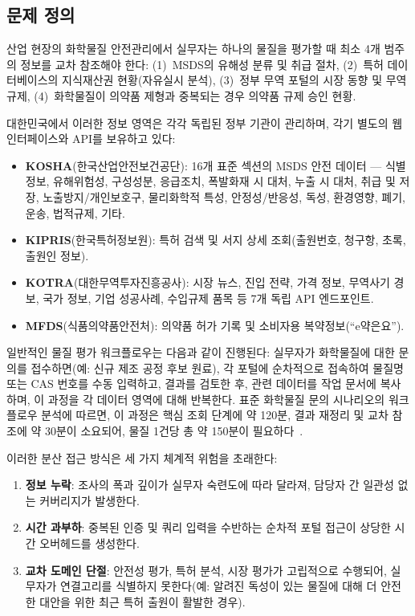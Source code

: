 \documentclass[preprint,12pt]{elsarticle}
\begin{document}
\subsection{문제 정의}

산업 현장의 화학물질 안전관리에서 실무자는 하나의 물질을 평가할 때 최소 4개 범주의 정보를 교차 참조해야 한다: (1)~MSDS의 유해성 분류 및 취급 절차, (2)~특허 데이터베이스의 지식재산권 현황(자유실시 분석), (3)~정부 무역 포털의 시장 동향 및 무역 규제, (4)~화학물질이 의약품 제형과 중복되는 경우 의약품 규제 승인 현황.

대한민국에서 이러한 정보 영역은 각각 독립된 정부 기관이 관리하며, 각기 별도의 웹 인터페이스와 API를 보유하고 있다:

\begin{itemize}
  \item \textbf{KOSHA}(한국산업안전보건공단): 16개 표준 섹션의 MSDS 안전 데이터 --- 식별정보, 유해위험성, 구성성분, 응급조치, 폭발화재 시 대처, 누출 시 대처, 취급 및 저장, 노출방지/개인보호구, 물리화학적 특성, 안정성/반응성, 독성, 환경영향, 폐기, 운송, 법적규제, 기타.
  \item \textbf{KIPRIS}(한국특허정보원): 특허 검색 및 서지 상세 조회(출원번호, 청구항, 초록, 출원인 정보).
  \item \textbf{KOTRA}(대한무역투자진흥공사): 시장 뉴스, 진입 전략, 가격 정보, 무역사기 경보, 국가 정보, 기업 성공사례, 수입규제 품목 등 7개 독립 API 엔드포인트.
  \item \textbf{MFDS}(식품의약품안전처): 의약품 허가 기록 및 소비자용 복약정보(``e약은요'').
\end{itemize}

일반적인 물질 평가 워크플로우는 다음과 같이 진행된다: 실무자가 화학물질에 대한 문의를 접수하면(예: 신규 제조 공정 후보 원료), 각 포털에 순차적으로 접속하여 물질명 또는 CAS 번호를 수동 입력하고, 결과를 검토한 후, 관련 데이터를 작업 문서에 복사하며, 이 과정을 각 데이터 영역에 대해 반복한다. 표준 화학물질 문의 시나리오의 워크플로우 분석에 따르면, 이 과정은 핵심 조회 단계에 약 120분, 결과 재정리 및 교차 참조에 약 30분이 소요되어, 물질 1건당 총 약 150분이 필요하다~\cite{occupational_safety_2023}.

이러한 분산 접근 방식은 세 가지 체계적 위험을 초래한다:

\begin{enumerate}
  \item \textbf{정보 누락}: 조사의 폭과 깊이가 실무자 숙련도에 따라 달라져, 담당자 간 일관성 없는 커버리지가 발생한다.
  \item \textbf{시간 과부하}: 중복된 인증 및 쿼리 입력을 수반하는 순차적 포털 접근이 상당한 시간 오버헤드를 생성한다.
  \item \textbf{교차 도메인 단절}: 안전성 평가, 특허 분석, 시장 평가가 고립적으로 수행되어, 실무자가 연결고리를 식별하지 못한다(예: 알려진 독성이 있는 물질에 대해 더 안전한 대안을 위한 최근 특허 출원이 활발한 경우).
\end{enumerate}
\end{document}
